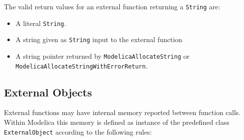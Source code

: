 The valid return values for an external function returning a \lstinline!String! are:
\begin{itemize}
\item A literal \lstinline!String!.
\item A string given as \lstinline!String! input to the external function
\item A string pointer returned by \lstinline!ModelicaAllocateString! or \lstinline!ModelicaAllocateStringWithErrorReturn!.
\end{itemize}

\subsection{External Objects}

External functions may have internal memory reported between function
calls. Within Modelica this memory is defined as instance of the
predefined class \lstinline!ExternalObject! according to the following rules:

